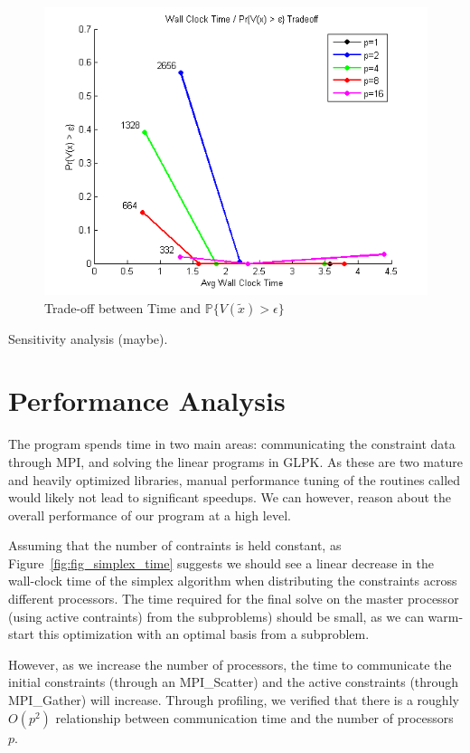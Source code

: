\documentclass[12pt]{article}
\begin{document}
\begin{figure}[ht]
	\centering
		\includegraphics{../plot/figs/wct_probviolprobgreateps_frontier_constraint.png}
	\caption{Trade-off between Time and $\mathbb{P}\{V(\tilde{x}) > \epsilon \}$}
	\label{fig:wct_probviolprobgreateps_frontier_constraint}
\end{figure}


Sensitivity analysis (maybe).
\section*{Performance Analysis}

The program spends time in two main areas: communicating the constraint data through MPI, and solving the linear programs in GLPK.  
As these are two mature and heavily optimized libraries, manual performance tuning of the routines called would likely not lead to significant speedups.
We can however, reason about the overall performance of our program at a high level.

Assuming that the number of contraints is held constant, as Figure~\ref{fig:fig_simplex_time} suggests we should see a linear decrease in the wall-clock time of the simplex algorithm when distributing the constraints across different processors.  
The time required for the final solve on the master processor (using active contraints) from the subproblems) should be small, as we can warm-start this optimization with an optimal basis from a subproblem.

However, as we increase the number of processors, the time to communicate the initial constraints (through an MPI\_Scatter) and the active constraints (through MPI\_Gather) will increase.
Through profiling, we verified that there is a roughly $O(p^2)$ relationship between communication time and the number of processors $p$.
\end{document}
